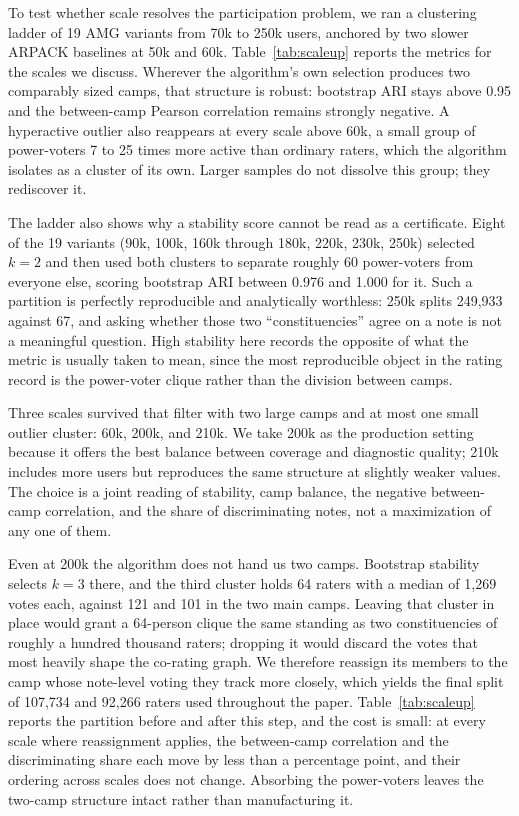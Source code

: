 \documentclass[10pt,twocolumn]{article}
\begin{document}
To test whether scale resolves the participation problem, we ran a clustering ladder of 19 AMG variants from 70k to 250k users, anchored by two slower ARPACK baselines at 50k and 60k. Table~\ref{tab:scaleup} reports the metrics for the scales we discuss. Wherever the algorithm's own selection produces two comparably sized camps, that structure is robust: bootstrap ARI stays above 0.95 and the between-camp Pearson correlation remains strongly negative. A hyperactive outlier also reappears at every scale above 60k, a small group of power-voters 7 to 25 times more active than ordinary raters, which the algorithm isolates as a cluster of its own. Larger samples do not dissolve this group; they rediscover it.

The ladder also shows why a stability score cannot be read as a certificate. Eight of the 19 variants (90k, 100k, 160k through 180k, 220k, 230k, 250k) selected $k=2$ and then used both clusters to separate roughly 60 power-voters from everyone else, scoring bootstrap ARI between 0.976 and 1.000 for it. Such a partition is perfectly reproducible and analytically worthless: 250k splits 249{,}933 against 67, and asking whether those two ``constituencies'' agree on a note is not a meaningful question. High stability here records the opposite of what the metric is usually taken to mean, since the most reproducible object in the rating record is the power-voter clique rather than the division between camps.

Three scales survived that filter with two large camps and at most one small outlier cluster: 60k, 200k, and 210k. We take 200k as the production setting because it offers the best balance between coverage and diagnostic quality; 210k includes more users but reproduces the same structure at slightly weaker values. The choice is a joint reading of stability, camp balance, the negative between-camp correlation, and the share of discriminating notes, not a maximization of any one of them.

Even at 200k the algorithm does not hand us two camps. Bootstrap stability selects $k=3$ there, and the third cluster holds 64 raters with a median of 1{,}269 votes each, against 121 and 101 in the two main camps. Leaving that cluster in place would grant a 64-person clique the same standing as two constituencies of roughly a hundred thousand raters; dropping it would discard the votes that most heavily shape the co-rating graph. We therefore reassign its members to the camp whose note-level voting they track more closely, which yields the final split of 107{,}734 and 92{,}266 raters used throughout the paper. Table~\ref{tab:scaleup} reports the partition before and after this step, and the cost is small: at every scale where reassignment applies, the between-camp correlation and the discriminating share each move by less than a percentage point, and their ordering across scales does not change. Absorbing the power-voters leaves the two-camp structure intact rather than manufacturing it.
\end{document}
